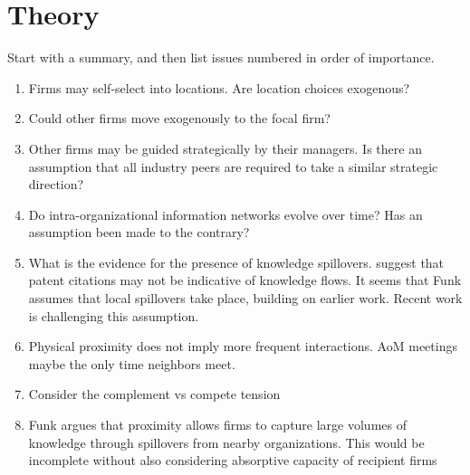 \documentclass[12pt,letterpaper]{article}
\begin{document}
\section{Theory}
Start with a summary, and then list issues numbered in order of importance.
\begin{enumerate}
  \item Firms may self-select into locations. Are location choices exogenous?
  \item Could other firms move exogenously to the focal firm?
  \item Other firms may be guided strategically by their managers. Is there an assumption that all industry peers are required to take a similar strategic direction?
  \item Do intra-organizational information networks evolve over time? Has an assumption been made to the contrary?
  \item What is the evidence for the presence of knowledge spillovers. \cite{Arora2017a} suggest that patent citations may not be indicative of knowledge flows. It seems that Funk assumes that local spillovers take place, building on earlier work. Recent work is challenging this assumption.
  \item Physical proximity does not imply more frequent interactions. AoM meetings maybe the only time neighbors meet.
  \item Consider the complement vs compete tension
    \item Funk argues that proximity allows firms to capture large volumes of knowledge through spillovers from nearby organizations. This would be incomplete without also considering absorptive capacity of recipient firms
\end{enumerate}
\end{document}
